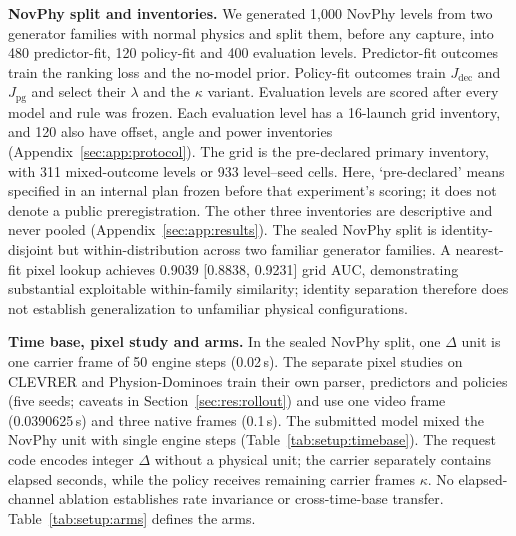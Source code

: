 \begin{revblock}\nopagebreak
\textbf{NovPhy split and inventories.} We generated 1,000 NovPhy \citep{pinto2024novphy} levels from two generator families with normal physics and split them, before any capture, into 480 predictor-fit, 120 policy-fit and 400 evaluation levels. Predictor-fit outcomes train the ranking loss and the no-model prior. Policy-fit outcomes train $J_{\mathrm{dec}}$ and $J_{\mathrm{pg}}$ and select their $\lambda$ and the $\kappa$ variant. Evaluation levels are scored after every model and rule was frozen. Each evaluation level has a 16-launch grid inventory, and 120 also have offset, angle and power inventories (Appendix~\ref{sec:app:protocol}). The grid is the pre-declared primary inventory, with 311 mixed-outcome levels or 933 level--seed cells. Here, `pre-declared' means specified in an internal plan frozen before that experiment's scoring; it does not denote a public preregistration. The other three inventories are descriptive and never pooled (Appendix~\ref{sec:app:results}). The sealed NovPhy split is identity-disjoint but within-distribution across two familiar generator families. A nearest-fit pixel lookup achieves 0.9039 [0.8838, 0.9231] grid AUC, demonstrating substantial exploitable within-family similarity; identity separation therefore does not establish generalization to unfamiliar physical configurations.

\textbf{Time base, pixel study and arms.} In the sealed NovPhy split, one $\Delta$ unit is one carrier frame of 50 engine steps (0.02\,s). The separate pixel studies on CLEVRER \citep{yi2020clevrer} and Physion-Dominoes \citep{bear2021physion} train their own parser, predictors and policies (five seeds; caveats in Section~\ref{sec:res:rollout}) and use one video frame (0.0390625\,s) and three native frames (0.1\,s). The submitted model mixed the NovPhy unit with single engine steps (Table~\ref{tab:setup:timebase}). The request code encodes integer $\Delta$ without a physical unit; the carrier separately contains elapsed seconds, while the policy receives remaining carrier frames $\kappa$. No elapsed-channel ablation establishes rate invariance or cross-time-base transfer. Table~\ref{tab:setup:arms} defines the arms.


\end{revblock}

